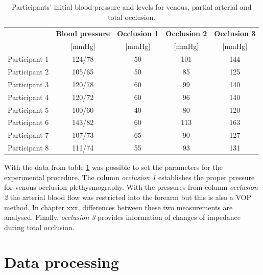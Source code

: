 \begin{table}[!htbp] %
	\caption[Blood pressure and occlusion levels of the participants]{Participants' initial blood pressure and levels for venous, partial arterial and total occlusion.}
	\label{tbl:occlusions}
	\centering
	\begin{tabular}    {lcccc}
		\toprule
		& \textbf{Blood pressure}  &  \textbf{Occlusion 1}   & \textbf{Occlusion 2}  &  \textbf{Occlusion 3} \\
		&  [\si{\mmHg}]   &        [\si{\mmHg}]  &    [\si{\mmHg}]   &  [\si{\mmHg}]\\ \midrule
		Participant 1  &  124/78   &        50  &    101   &  144\\ 
		Participant 2  &  105/65   &        50  &     85   &  125 \\
		Participant 3  &  120/78   &        60  &     99   &  140 \\
		Participant 4  &  120/72   &        60  &     96   &  140 \\
		Participant 5  &  100/60   &        40  &     80   &  120 \\
		Participant 6  &  143/82   &        60  &    113   &  163 \\
		Participant 7  &  107/73   &        65  &     90   &  127 \\
		Participant 8  &  111/74   &        55  &     93   &  131 \\\bottomrule
	\end{tabular}
\end{table}

With the data from table \ref{tbl:occlusions} was possible to set the parameters for the experimental procedure. The column \textit{occlusion 1} establishes the proper pressure for venous occlusion plethysmography. With the pressures from column \textit{occlusion 2} the arterial blood flow was restricted into the forearm but this is also a VOP method. In chapter xxx,  differences between these two measurements are analysed. Finally, \textit{occlusion 3} provides information of changes of impedance during total occlusion.

\section{Data processing}
\label{section procedure 3}

